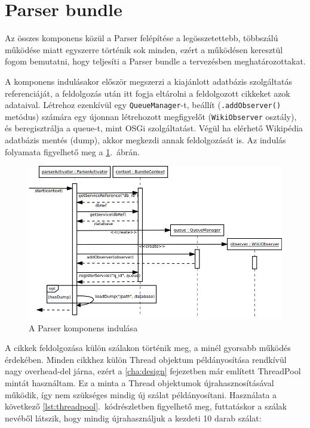 
\section{Parser bundle}
\label{sec:parserbundle}

Az összes komponens közül a Parser felépítése a legösszetettebb, többszálú működése miatt egyszerre történik sok minden, ezért a működésen keresztül fogom bemutatni, hogy teljesíti a Parser bundle a tervezésben meghatározottakat.

A komponens indulásakor először megszerzi a kiajánlott adatbázis szolgáltatás referenciáját, a feldolgozás után itt fogja eltárolni a feldolgozott cikkeket azok adataival. Létrehoz ezenkívül egy \texttt{QueueManager}-t, beállít (\texttt{.addObserver()} metódus) számára egy újonnan létrehozott megfigyelőt (\texttt{WikiObserver} osztály), és beregisztrálja a queue-t, mint OSGi szolgáltatást. Végül ha elérhető Wikipédia adatbázis mentés (dump), akkor megkezdi annak feldolgozását is. Az indulás folyamata figyelhető meg a \ref{fig:sequence_parser}.~ábrán.

\begin{figure}[htp]
\centering
\includegraphics[scale=0.5]{img/sequence_parser}
\caption{A Parser komponens indulása}
\label{fig:sequence_parser}
\end{figure}

A cikkek feldolgozása külön szálakon történik meg, a minél gyorsabb működés érdekében. Minden cikkhez külön Thread objektum példányosítása rendkívül nagy overhead-del járna, ezért a \ref{cha:design} fejezetben már említett ThreadPool mintát használtam. Ez a minta a Thread objektumok újrahasznosításával működik, így nem szükséges mindig új szálat példányosítani. Használata a következő \ref{lst:threadpool}.~kódrészletben figyelhető meg, futtatáskor a szálak nevéből látszik, hogy mindig újrahasználjuk a kezdeti 10 darab szálat:

